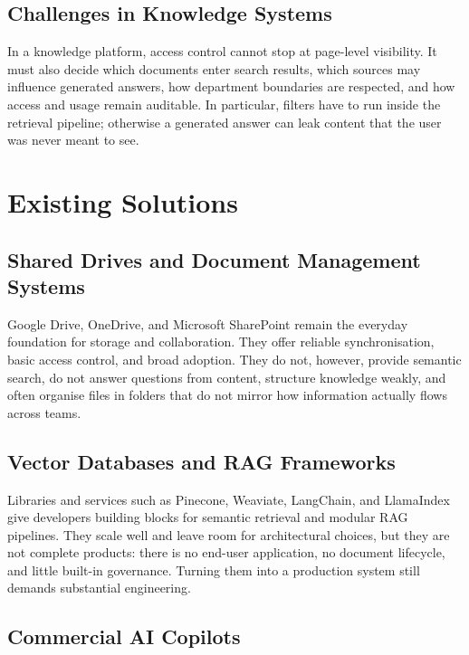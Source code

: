 \subsection{Challenges in Knowledge Systems}

In a knowledge platform, access control cannot stop at page-level visibility. It
must also decide which documents enter search results, which sources may influence
generated answers, how department boundaries are respected, and how access and
usage remain auditable. In particular, filters have to run inside the retrieval
pipeline; otherwise a generated answer can leak content that the user was never
meant to see.

\section{Existing Solutions}

\subsection{Shared Drives and Document Management Systems}

Google Drive, OneDrive, and Microsoft SharePoint \cite{microsoft-sharepoint}
remain the everyday foundation for storage and collaboration. They offer reliable
synchronisation, basic access control, and broad adoption. They do not, however,
provide semantic search, do not answer questions from content, structure
knowledge weakly, and often organise files in folders that do not mirror how
information actually flows across teams.

\subsection{Vector Databases and RAG Frameworks}

Libraries and services such as Pinecone, Weaviate, LangChain, and LlamaIndex
\cite{pinecone-docs, langchain-docs, llamaindex-docs} give developers building
blocks for semantic retrieval and modular RAG pipelines. They scale well and
leave room for architectural choices, but they are not complete products: there
is no end-user application, no document lifecycle, and little built-in governance.
Turning them into a production system still demands substantial engineering.

\subsection{Commercial AI Copilots}

